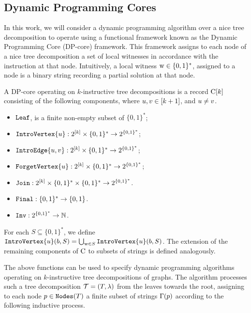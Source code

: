 \subsection{Dynamic Programming Cores}\label{DPcores}

In this work, we will consider a dynamic programming algorithm over a nice tree decomposition to operate using a functional framework known as the Dynamic Programming Core (DP-core) \cite{Baste2022,From2023} framework. 
This framework assigns to each node of a nice tree decomposition a set of local witnesses in accordance with the instruction at that node. Intuitively, a local witness $\mathrm{w} \in \{0,1\}^*$, assigned to a node is a binary string recording a partial solution at that node.

A DP-core operating on $k$-instructive tree decompositions is a record $\mathrm{C}[k]$ consisting of the following components, where $u,v \in [k+1]$, and 
$u\neq v$. 


\begin{itemize}
    \item $\texttt{Leaf}$, is a finite non-empty subset of ${\{0,1\}^*}$;
    \item $\texttt{IntroVertex}\{u\}:2^{[k]}\times \{0,1\}^*\rightarrow 2^{\{0,1\}^*}$;
    \item $\texttt{IntroEdge}\{u,v\}:2^{[k]}\times\{0,1\}^*\rightarrow 2^{\{0,1\}^*}$;
    \item $\texttt{ForgetVertex}\{u\}:2^{[k]}\times \{0,1\}^*\rightarrow 2^{\{0,1\}^*}$;
    \item $\texttt{Join}:2^{[k]}\times \{0,1\}^*\times \{0,1\}^*\rightarrow 2^{\{0,1\}^*}$.
    \item $\texttt{Final}:\{0,1\}^*\rightarrow \{0,1\}$. 
    \item $\texttt{Inv}:2^{\{0,1\}^*}\rightarrow \mathbb{N}$. 
\end{itemize}
%

For each $S\subseteq \{0,1\}^*$, we define $\texttt{IntroVertex}\{u\}(b,S) = \bigcup_{\mathrm{w}\in S} \texttt{IntroVertex}\{u\}(b,S)$. 
The extension of the remaining components of $\mathrm{C}$ to subsets of strings is defined analogously. 

The above functions can be used to specify dynamic programming algorithms operating on $k$-instructive tree decompositions of graphs. The algorithm processes such a tree decomposition $\mathcal{T} = (T,\lambda)$ from the leaves towards the root, assigning to each node $p\in \texttt{Nodes}(T)$ a finite subset of strings $\Gamma(p)$ according to the following inductive process. 

